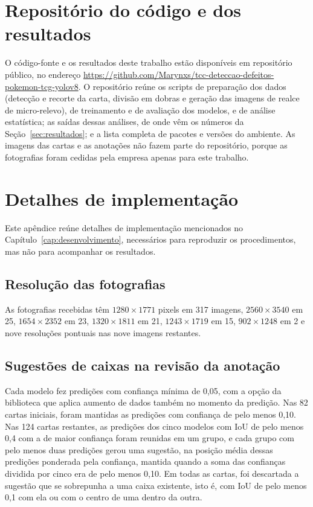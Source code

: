 \documentclass[
    12pt,                %
    openright,           %
    oneside,             %
    a4paper,             %
    english,             %
    brazil               %
]{abntex2}
\begin{document}
\begin{apendicesenv}
\partapendices

\chapter{Repositório do código e dos resultados}
\label{ap:repositorio}

O código-fonte e os resultados deste trabalho estão disponíveis em
repositório público, no endereço
\url{https://github.com/Marynxs/tcc-deteccao-defeitos-pokemon-tcg-yolov8}.
O repositório reúne os scripts de preparação dos dados (detecção e
recorte da carta, divisão em dobras e geração das imagens de realce de
micro-relevo), de treinamento e de avaliação dos modelos, e de análise
estatística; as saídas dessas análises, de onde vêm os números da
Seção~\ref{sec:resultados}; e a lista completa de pacotes e versões do
ambiente. As imagens das cartas e as anotações não fazem parte do
repositório, porque as fotografias foram cedidas pela empresa apenas para este trabalho.

\chapter{Detalhes de implementação}
\label{ap:implementacao}

Este apêndice reúne detalhes de implementação mencionados no
Capítulo~\ref{cap:desenvolvimento}, necessários para reproduzir os
procedimentos, mas não para acompanhar os resultados.

\section{Resolução das fotografias}

As fotografias recebidas têm $1280 \times 1771$ pixels em 317 imagens,
$2560 \times 3540$ em 25, $1654 \times 2352$ em 23, $1320 \times 1811$
em 21, $1243 \times 1719$ em 15, $902 \times 1248$ em 2 e nove
resoluções pontuais nas nove imagens restantes.

\section{Sugestões de caixas na revisão da anotação}

Cada modelo fez predições com confiança mínima de 0,05, com a opção da
biblioteca que aplica aumento de dados também no momento da predição.
Nas 82 cartas iniciais, foram mantidas as predições com confiança de
pelo menos 0,10. Nas 124 cartas restantes, as predições dos cinco
modelos com IoU de pelo menos 0,4 com a de maior confiança foram
reunidas em um grupo, e cada grupo com pelo menos duas predições gerou
uma sugestão, na posição média dessas predições ponderada pela
confiança, mantida quando a soma das confianças dividida por cinco era
de pelo menos 0,10. Em todas as cartas, foi descartada a sugestão que se
sobrepunha a uma caixa existente, isto é, com IoU de pelo menos 0,1 com
ela ou com o centro de uma dentro da outra.


\end{apendicesenv}
\end{document}
